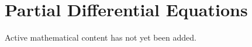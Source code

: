 
\section{Partial Differential Equations}

\begin{remark*}
Active mathematical content has not yet been added.
\end{remark*}
